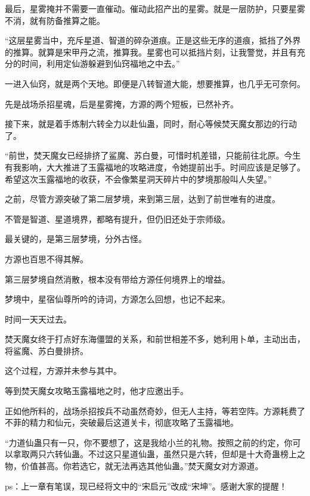 \begin{this_body}
最后，星雾掩并不需要一直催动。催动此招产出的星雾。就是一层防护，只要星雾不消，就有防备推算之能。

“这层星雾当中，充斥星道、智道的碎杂道痕。正是这些无序的道痕，抵挡了外界的推算。就算是宋甲丹之流，推算我。星雾也可以抵挡片刻，让我警觉，并且有充分的时间，利用定仙游躲避到仙窍福地之中去。”

一进入仙窍，就是两个天地。即便是八转智道大能，想要推算，也几乎无可奈何。

先是战场杀招星魂，后是星雾掩，方源的两个短板，已然补齐。

接下来，就是着手炼制六转全力以赴仙蛊，同时，耐心等候焚天魔女那边的行动了。

“前世，焚天魔女已经排挤了鲨魔、苏白曼，可惜时机差错，只能前往北原。今生有我影响，大大推进了玉露福地的攻略进度，令她提前出手。时间应该是足够了。希望这次玉露福地的收获，不会像繁星洞天碎片中的梦境那般叫人失望。”

之前，尽管方源突破了第二层梦境，来到第三层，达到了前世唯有的进度。

不管是智道、星道境界，都略有提升，但仍旧还处于宗师级。

最关键的，是第三层梦境，分外古怪。

方源也百思不得其解。

第三层梦境自然消散，根本没有带给方源任何境界上的增益。

梦境中，星宿仙尊所吟的诗词，方源怎么回想，也记不起来。

时间一天天过去。

焚天魔女终于打点好东海僵盟的关系，和前世相差不多，她利用卜单，主动出击，将鲨魔、苏白曼排挤。

这个过程，方源并未参与其中。

等到焚天魔女攻略玉露福地之时，他才应邀出手。

正如他所料的，战场杀招按兵不动虽然奇妙，但无人主持，等若空阵。方源耗费了不菲的精力和仙元，突破最后这道关卡，彻底攻略了玉露福地。

“力道仙蛊只有一只，你不要想了，这是我给小兰的礼物。按照之前的约定，你可以拿取两只六转仙蛊。不过这只星道仙蛊，虽然只是六转，但却是十大奇蛊榜上之物，价值甚高。你若选它，就无法再选其他仙蛊。”焚天魔女对方源道。

ps：上一章有笔误，现已经将文中的“宋启元”改成“宋坤”。感谢大家的提醒！

\end{this_body}

